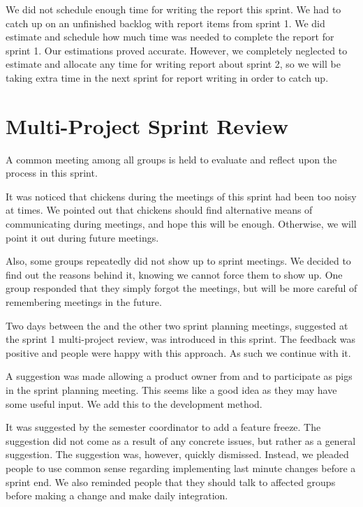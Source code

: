 We did not schedule enough time for writing the report this sprint. We had to catch up on an unfinished backlog with report items from sprint 1. We did estimate and schedule how much time was needed to complete the report for sprint 1. Our estimations proved accurate. However, we completely neglected to estimate and allocate any time for writing report about sprint 2, so we will be taking extra time in the next sprint for report writing in order to catch up.

\section{Multi-Project Sprint Review}\label{sec:s2_multiprj_review}
A common meeting among all groups is held to evaluate and reflect upon the process in this sprint.

It was noticed that chickens during the meetings of this sprint had been too noisy at times. We pointed out that chickens should find alternative means of communicating during meetings, and hope this will be enough. Otherwise, we will point it out during future meetings.

Also, some groups repeatedly did not show up to sprint meetings. We decided to find out the reasons behind it, knowing we cannot force them to show up. One group responded that they simply forgot the meetings, but will be more careful of remembering meetings in the future.

Two days between the \gui and the other two sprint planning meetings, suggested at the sprint 1 multi-project review, was introduced in this sprint. The feedback was positive and people were happy with this approach. As such we continue with it.

A suggestion was made allowing a product owner from \db and \bd to participate as pigs in the \gui sprint planning meeting. This seems like a good idea as they may have some useful input. We add this to the development method.

It was suggested by the semester coordinator to add a feature freeze. The suggestion did not come as a result of any concrete issues, but rather as a general suggestion. The suggestion was, however, quickly dismissed. Instead, we pleaded people to use common sense regarding implementing last minute changes before a sprint end. We also reminded people that they should talk to affected groups before making a change and make daily integration.